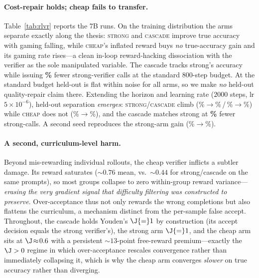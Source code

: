\paragraph{Cost-repair holds; cheap fails to transfer.} Table~\ref{tab:rlvr} reports the 7B runs. On the
training distribution the arms separate exactly along the thesis: \textsc{strong} and \textsc{cascade} improve
true accuracy with gaming falling, while \textsc{cheap}'s inflated reward buys \emph{no} true-accuracy gain
and its gaming rate rises---a clean in-loop reward-hacking dissociation with the verifier as the sole
manipulated variable. The cascade tracks strong's accuracy while issuing \textbf{\mSevenBSavings\%} fewer
strong-verifier calls at the standard $800$-step budget. At the standard budget held-out is flat within noise
for all arms, so we make \emph{no} held-out quality-repair claim there. Extending the horizon and learning
rate ($2000$ steps, lr $5{\times}10^{-6}$), held-out separation \emph{emerges}: \textsc{strong}/\textsc{cascade}
climb (\longStrongHoBase\%$\to$\longStrongHoFinal\%\,/\,\longCascadeHoBase\%$\to$\longCascadeHoFinal\%) while
\textsc{cheap} does not (\longCheapHoBase\%$\to$\longCheapHoFinal\%), and the cascade matches strong at
\textbf{\longSavings\%} fewer strong-calls. A second seed reproduces the strong-arm gain
(\longStrongBHoBase\%$\to$\longStrongBHoFinal\%).

\paragraph{A second, curriculum-level harm.} Beyond mis-rewarding individual rollouts, the cheap verifier
inflicts a subtler damage. Its reward saturates ($\sim\!0.76$ mean, vs.\ $\sim\!0.44$ for strong/cascade on
the same prompts), so most groups collapse to zero within-group reward variance---\emph{erasing the very
gradient signal that difficulty filtering was constructed to preserve}. Over-acceptance thus not only rewards
the wrong completions but also flattens the curriculum, a mechanism distinct from the per-sample false accept.
Throughout, the cascade holds Youden's $\J{=}1$ by construction (its accept decision equals the strong
verifier's), the strong arm $\J{=}1$, and the cheap arm sits at $\J\!\approx\!0.6$ with a persistent
$\sim\!13$-point free-reward premium---exactly the $\J>0$ regime in which over-acceptance rescales
convergence rather than immediately collapsing it, which is why the cheap arm converges \emph{slower} on true
accuracy rather than diverging.

